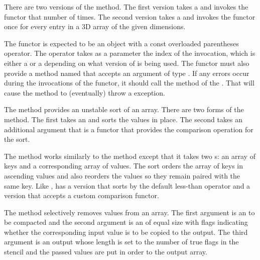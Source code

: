 \begin{description}
  There are two versions of the  method. The first
  version takes a  and invokes the functor that number of
  times. The second version takes a  and invokes the functor once
  for every entry in a 3D array of the given dimensions.

  The functor is expected to be an object with a const overloaded
  parentheses operator. The operator takes as a parameter the index of the
  invocation, which is either a  or a  depending on what
  version of  is being used. The functor must also
  provide a method named  that accepts an
  argument of type . If any errors
  occur during the invocations of the functor, it should call the
   method of the
  . That will cause the
   method to (eventually) throw a
   exception.
\item[\textcode{Sort}]  The  method provides an
  unstable sort of an array. There are two forms of the 
  method. The first takes an  and sorts the
  values in place. The second takes an additional argument that is a
  functor that provides the comparison operation for the sort.
\item[\textcode{SortByKey}]  The 
  method works similarly to the  method except that it takes
  two s: an array of keys and a corresponding
  array of values. The sort orders the array of keys in ascending values
  and also reorders the values so they remain paired with the same
  key. Like ,  has a version that sorts
  by the default less-than operator and a version that accepts a custom
  comparison functor.
\item[\textcode{StreamCompact}]  The
   method selectively removes values from an
  array. The first argument is an  to be
  compacted and the second argument is an  of
  equal size with flags indicating whether the corresponding input value is
  to be copied to the output. The third argument is an output
   whose length is set to the number of true
  flags in the stencil and the passed values are put in order to the output
  array.


\end{description}
